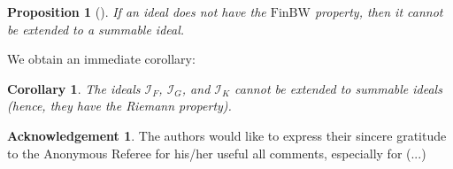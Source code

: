 \documentclass{amsart}
\newtheorem{prop}[thm]{Proposition}
\newtheorem{cor}[thm]{Corollary}
\theoremstyle{definition}
\newtheorem*{acknowledgement}{Acknowledgement}
\newcommand{\I}{\mathcal I}
\newcommand{\finbw}{\text{FinBW}}
\begin{document}
\begin{prop}[{\cite[Corollary 3.5]{H3}}]
If an ideal does not have the $\finbw$ property, then it cannot be extended to a summable ideal.
\end{prop}

We obtain an immediate corollary:
\begin{cor}
The ideals $\I_F$, $\I_G$, and $\I_K$ cannot be extended to summable ideals (hence, they have the Riemann property).
\end{cor}

\begin{acknowledgement}
The authors would like to express their sincere gratitude to the Anonymous Referee
for his/her useful all comments, especially for (...)
\end{acknowledgement}
\end{document}
